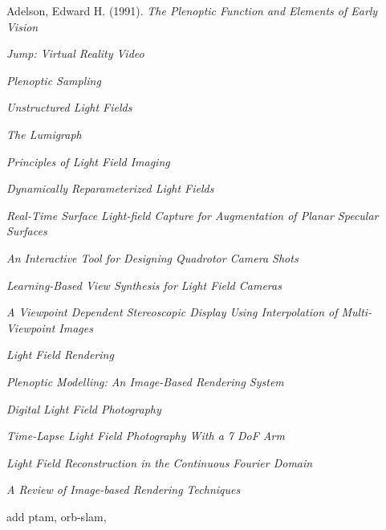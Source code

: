 \documentclass[12pt]{report}
\begin{document}
\begin{thebibliography}{10}%

	Adelson, Edward H. (1991). \emph{The Plenoptic Function and Elements of Early Vision}

	\emph{Jump: Virtual Reality Video}

	\emph{Plenoptic Sampling}

	\emph{Unstructured Light Fields}

	\emph{The Lumigraph}
	
	\emph{Principles of Light Field Imaging}	
	
	\emph{Dynamically Reparameterized Light Fields}

	\emph{Real-Time Surface Light-field Capture for Augmentation of Planar Specular Surfaces}
	
	\emph{An Interactive Tool for Designing Quadrotor Camera Shots}

	\emph{Learning-Based View Synthesis for Light Field Cameras}

	\emph{A Viewpoint Dependent Stereoscopic Display Using Interpolation of Multi-Viewpoint Images}
	
	\emph{Light Field Rendering}
	
	\emph{Plenoptic Modelling: An Image-Based Rendering System}

	\emph{Digital Light Field Photography}	

	\emph{Time-Lapse Light Field Photography With a 7 DoF Arm}

	\emph{Light Field Reconstruction in the Continuous Fourier Domain}

	\emph{A Review of Image-based Rendering Techniques}
	
	add ptam, orb-slam, 




\begin{comment}
\bibitem{Anderson01}
	Anderson, Jr., J.D. (2001). \emph{Fundamentals of Aerodynamics} McGraw Hill

\bibitem{Ariff11}
	Ariff, O.K. and Go, T.H. (2011). \emph{Waypoint Navigation of Small-Scale UAV incorporating Dynamic Soaring} The Journal of Navigation


\end{comment}
\end{thebibliography}
\end{document}
